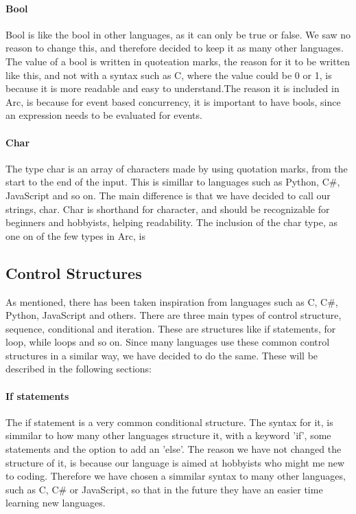 \paragraph*{Bool}
Bool is like the bool in other languages, as it can only be true or false. We saw no reason to change this, and therefore decided to keep it as many other languages. The value of a bool is written in quoteation marks, the reason for it to be written like this, and not with a syntax such as C, where the value could be 0 or 1, is because it is more readable and easy to understand.The reason it is included in Arc, is because for event based concurrency, it is important to have bools, since an expression needs to be evaluated for events.

\paragraph*{Char}
The type char is an array of characters made by using quotation marks, from the start to the end of the input.  This is simillar to languages such as Python, C\#, JavaScript and so on. The main difference is that we have decided to call our strings, char. Char is shorthand for character, and should be recognizable for beginners and hobbyists, helping readability. The inclusion of the char type, as one on of the few types in Arc, is 


\subsection{Control Structures}
As mentioned, there has been taken inspiration from languages such as C, C\#, Python, JavaScript and others. There are three main types of control structure, sequence, conditional and iteration. These are structures like if statements, for loop, while loops and so on. Since many languages use these common control structures in a similar way, we have decided to do the same. These will be described in the following sections:

\paragraph*{If statements}
The if statement is a very common conditional structure. The syntax for it, is simmilar to how many other languages structure it, with a keyword 'if', some statements and the option to add an 'else'. The reason we have not changed the structure of it, is because our language is aimed at hobbyists who might me new to coding. Therefore we have chosen a simmilar syntax to many other languages, such as C, C\# or JavaScript, so that in the future they have an easier time learning new languages.

